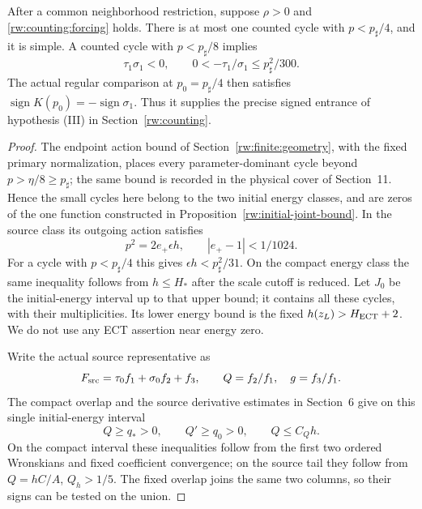 \begin{proposition}\label{rw:small-entrance}
After a common neighborhood restriction, suppose $\rho>0$ and
\eqref{rw:counting:forcing} holds. There is at most one counted
cycle with $p<p_\sharp/4$, and it is simple. A counted cycle with
$p<p_\sharp/8$ implies
\begin{equation}\label{rw:upper:small-ratio}
 \tau_1\sigma_1<0,\qquad
 0<-\tau_1/\sigma_1\le p_\sharp^2/300.
\end{equation}
The actual regular comparison at $p_0=p_\sharp/4$ then satisfies
$\operatorname{sign}K(p_0)=-\operatorname{sign}\sigma_1$.
Thus it supplies the precise signed entrance of hypothesis
\textup{(III)} in Section~\ref{rw:counting}.
\end{proposition}
\begin{proof}
The endpoint action bound of Section~\ref{rw:finite:geometry},
with the fixed primary normalization, places every parameter-dominant
cycle beyond $p>\eta/8\ge p_\sharp$; the same bound is recorded
in the physical cover of Section~11. Hence the small cycles here
belong to the two initial energy classes, and are zeros of the one
function constructed in Proposition~\ref{rw:initial-joint-bound}.
In the source class its outgoing action satisfies
\[
 p^2=2e_+\epsilon h,\qquad |e_+-1|<1/1024.
\]
For a cycle with $p<p_\sharp/4$ this gives
$\epsilon h<p_\sharp^2/31$. On the compact energy class the
same inequality follows from $h\le H_*$ after the scale cutoff
is reduced. Let $J_0$ be the initial-energy interval up to that
upper bound; it contains all these cycles, with their multiplicities.
Its lower energy bound is the fixed $h(z_L)>H_{\rm ECT}+2$.
We do not use any ECT assertion near energy zero.

Write the actual source representative as
\[
 F_{\rm src}=\tau_0 f_1+\sigma_0 f_2+f_3,
 \qquad Q=f_2/f_1,\quad g=f_3/f_1.
\]
The compact overlap and the source derivative estimates in Section~6
give on this single initial-energy interval
\[
 Q\ge q_*>0,\qquad Q'\ge q_0>0,\qquad Q\le C_Qh.
\]
On the compact interval these inequalities follow from the first two
ordered Wronskians and fixed coefficient convergence; on the source
tail they follow from $Q=hC/A$, $Q_h>1/5$. The fixed overlap joins
the same two columns, so their signs can be tested on the union.


\end{proof}
